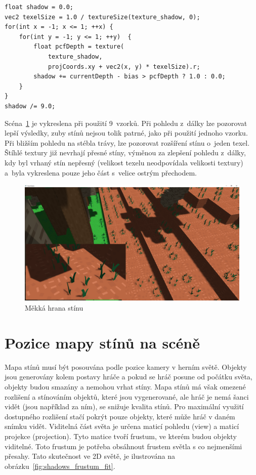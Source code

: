 \documentclass[thesis=M,czech]{FITthesis}[2019/12/23]
\begin{document}
\begin{verbatim}
float shadow = 0.0;
vec2 texelSize = 1.0 / textureSize(texture_shadow, 0);
for(int x = -1; x <= 1; ++x) {
    for(int y = -1; y <= 1; ++y)  {
        float pcfDepth = texture(
            texture_shadow,
            projCoords.xy + vec2(x, y) * texelSize).r;
        shadow += currentDepth - bias > pcfDepth ? 1.0 : 0.0;        
    }    
}
shadow /= 9.0;
\end{verbatim}

Scéna~\ref{fig:shadows_pcf_soft} je vykreslena při použití 9~vzorků. Při pohledu z~dálky lze pozorovat lepší výsledky, zuby stínů nejsou tolik patrné, jako při použití jednoho vzorku. Při bližším pohledu na stébla trávy, lze pozorovat rozšíření stínu o~jeden texel. Štíhlé textury již nevrhají přesné stíny, výměnou za zlepšení pohledu z~dálky, kdy byl vrhaný stín nepřesný (velikost texelu neodpovídala velikosti textury) a~byla vykreslena pouze jeho část s~velice ostrým přechodem.

\begin{figure}\centering
	\includegraphics[width=\textwidth]{images/shadows/pcf_soft}
	\caption[Měkká hrana stínu]{Měkká hrana stínu}\label{fig:shadows_pcf_soft}
\end{figure}

\section{Pozice mapy stínů na scéně}

Mapa stínů musí být posouvána podle pozice kamery v herním světě. Objekty jsou generovány kolem postavy hráče a pokud se hráč posune od počátku světa, objekty budou smazány a nemohou vrhat stíny. Mapa stínů má však omezené rozlišení a stínováním objektů, které jsou vygenerované, ale hráč je nemá šanci vidět (jsou například za ním), se snižuje kvalita stínů. Pro maximální využití dostupného rozlišení stačí pokrýt pouze objekty, které může hráč v daném snímku vidět. Viditelná část světa je určena maticí pohledu (view) a maticí projekce (projection). Tyto matice tvoří frustum, ve kterém budou objekty viditelné. Toto frustum je potřeba obsáhnout frustem světla s co nejmenšími přesahy. Tato skutečnost ve 2D světě, je ilustrována na obrázku~\ref{fig:shadows_frustum_fit}.
\end{document}

